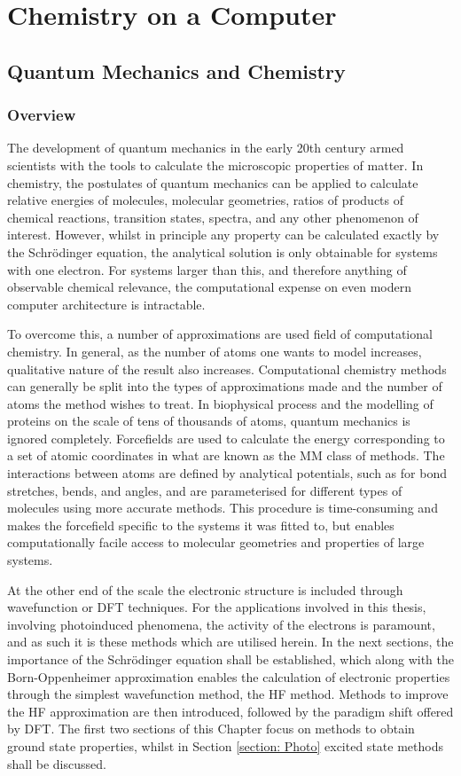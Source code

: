 \chapter{Chemistry on a Computer}
\newcommand{\schro}{Schr\"{o}dinger}
\label{chapter:theory}
\section{Quantum Mechanics and Chemistry}\label{section: QM}
\subsection{Overview}\label{section: QM_overview}
The development of quantum mechanics in the early 20th century armed scientists with the tools to calculate the microscopic properties of matter. In chemistry, the postulates of quantum mechanics can be applied to calculate relative energies of molecules, molecular geometries, ratios of products of chemical reactions, transition states, spectra, and any other phenomenon of interest. However, whilst in principle any property can be calculated exactly by the \schro{} equation, the analytical solution is only obtainable for systems with one electron. For systems larger than this, and therefore anything of observable chemical relevance, the computational expense on even modern computer architecture is intractable. 

To overcome this, a number of approximations are used field of computational chemistry. In general, as the number of atoms one wants to model increases, qualitative nature of the result also increases. Computational chemistry methods can generally be split into the types of approximations made and the number of atoms the method wishes to treat. In biophysical process and the modelling of proteins on the scale of tens of thousands of atoms, quantum mechanics is ignored completely. Forcefields are used to calculate the energy corresponding to a set of atomic coordinates in what are known as the \ac{MM} class of methods. The interactions between atoms are defined by analytical potentials, such as for bond stretches, bends, and angles, and are parameterised for different types of molecules using more accurate methods. This procedure is time-consuming and makes the forcefield specific to the systems it was fitted to, but enables computationally facile access to molecular geometries and properties of large systems.

At the other end of the scale the electronic structure is included through wavefunction or \ac{DFT} techniques. For the applications involved in this thesis, involving photoinduced phenomena, the activity of the electrons is paramount, and as such it is these methods which are utilised herein. In the next sections, the importance of the \schro{} equation shall be established, which along with the Born-Oppenheimer approximation enables the calculation of electronic properties through the simplest wavefunction method, the \ac{HF} method. Methods to improve the \ac{HF} approximation are then introduced, followed by the paradigm shift offered by \ac{DFT}. The first two sections of this Chapter focus on methods to obtain ground state properties, whilst in Section \ref{section: Photo} excited state methods shall be discussed. 
